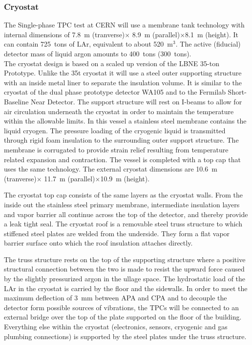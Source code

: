 \subsubsection{Cryostat}

The Single-phase TPC test at CERN will use a membrane tank technology
with internal dimensions of 7.8~m (tranverse)$\times$ 8.9~m
(parallel)$\times$8.1~m (height).  It can contain 725~tons of LAr,
equivalent to about 520~m$^3$. The active (fiducial) detector mass of
liquid argon amounts to 400~tons (300~tons).\\ The cryostat design is
based on a scaled up version of the LBNE 35-ton
Prototype\cite{montanari_35ton}.  Unlike the 35t cryostat it will use
a steel outer supporting structure with an inside metal liner to
separate the insulation volume. It is similar to the cryostat of the
dual phase prototype detector WA105 and to the Fermilab Short-Baseline
Near Detector. The support structure will rest on I-beams to allow for
air circulation underneath the cryostat in order to maintain the
temperature within the allowable limits.  In this vessel a stainless
steel membrane contains the liquid cryogen. The pressure loading of
the cryogenic liquid is transmitted through rigid foam insulation to
the surrounding outer support structure. The membrane is corrugated to
provide strain relief resulting from temperature related expansion and
contraction. The vessel is completed with a top cap that uses the same
technology.  The external cryostat dimensions are 10.6~m
(tranverse)$\times$ 11.7~m (parallel)$\times$10.9~m (height).


The cryostat top cap consists of the same layers as the cryostat
walls. From the inside out the stainless steel primary membrane,
intermediate insulation layers and vapor barrier all continue across
the top of the detector, and thereby provide a leak tight seal.  The
cryostat roof is a removable steel truss structure to which stiffened
steel plates are welded from the underside. They form a flat vapor
barrier surface onto which the roof insulation attaches directly.

The truss structure rests on the top of the supporting structure where
a positive structural connection between the two is made to resist the
upward force caused by the slightly pressurized argon in the ullage
space. The hydrostatic load of the LAr in the cryostat is carried by
the floor and the sidewalls. In order to meet the maximum deflection
of 3~mm between APA and CPA and to decouple the detector form possible
sources of vibrations, the TPCs will be connected to an external
bridge over the top of the plate supported on the floor of the
building. Everything else within the cryostat (electronics, sensors,
cryogenic and gas plumbing connections) is supported by the steel
plates under the truss structure.

